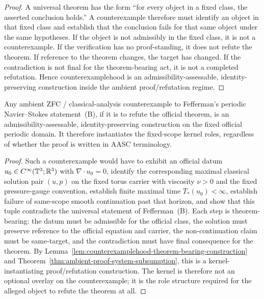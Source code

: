 \begin{proof}
A universal theorem has the form ``for every object in a fixed class, the asserted conclusion holds.'' A counterexample therefore must identify an object in that fixed class and establish that the conclusion fails for that same object under the same hypotheses. If the object is not admissibly in the fixed class, it is not a counterexample. If the verification has no proof-standing, it does not refute the theorem. If reference to the theorem changes, the target has changed. If the contradiction is not final for the theorem-bearing act, it is not a completed refutation. Hence counterexamplehood is an admissibility-assessable, identity-preserving construction inside the ambient proof/refutation regime.
\end{proof}

\begin{manualtheorem}
\label{thm:fefferman-counterexample-subsumption}
Any ambient ZFC / classical-analysis counterexample to Fefferman's periodic Navier--Stokes statement~(B), if it is to refute the official theorem, is an admissibility-assessable, identity-preserving construction on the fixed official periodic domain. It therefore instantiates the fixed-scope kernel roles, regardless of whether the proof is written in AASC terminology.
\end{manualtheorem}

\begin{proof}
Such a counterexample would have to exhibit an official datum $u_0\in C^\infty(\mathbb{T}^3;\mathbb{R}^3)$ with $\nabla\cdot u_0=0$, identify the corresponding maximal classical solution pair $(u,p)$ on the fixed torus carrier with viscosity $\nu>0$ and the fixed pressure-gauge convention, establish finite maximal time $T_*(u_0)<\infty$, establish failure of same-scope smooth continuation past that horizon, and show that this tuple contradicts the universal statement of Fefferman~(B). Each step is theorem-bearing: the datum must be admissible for the official class, the solution must preserve reference to the official equation and carrier, the non-continuation claim must be same-target, and the contradiction must have final consequence for the theorem. By Lemma~\ref{lem:counterexamplehood-theorem-bearing-construction} and Theorem~\ref{thm:ambient-proof-system-subsumption}, this is a kernel-instantiating proof/refutation construction. The kernel is therefore not an optional overlay on the counterexample; it is the role structure required for the alleged object to refute the theorem at all.
\end{proof}

